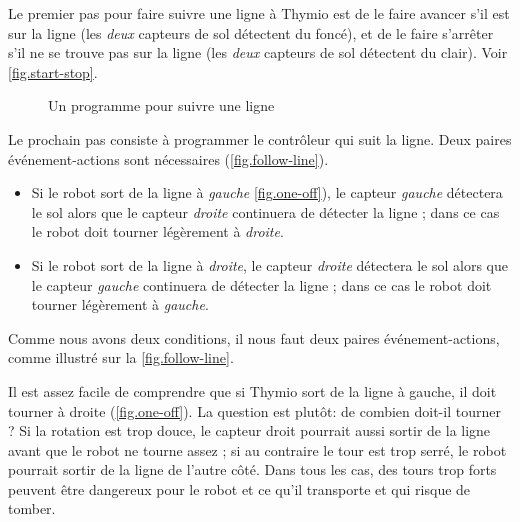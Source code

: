 Le premier pas pour faire suivre une ligne à Thymio est de le faire avancer s'il est sur la ligne (les \emph{deux} capteurs de sol détectent du foncé), et de le faire s'arrêter s'il ne se trouve pas sur la ligne (les \emph{deux} capteurs de sol détectent du clair).
Voir \cref{fig.start-stop}.

\begin{figure}
	\hfill
	\caption{Un programme pour suivre une ligne}
        \label{fig.follow-line-all}
\end{figure}



Le prochain pas consiste à programmer le contrôleur qui suit la ligne.
Deux paires événement-actions sont nécessaires (\cref{fig.follow-line}).

\begin{itemize}
    \item Si le robot sort de la ligne à \emph{gauche}
    \cref{fig.one-off}), le capteur \emph{gauche}
    détectera le sol alors que le capteur \emph{droite}
    continuera de détecter la ligne ;
    dans ce cas le robot doit tourner légèrement à
    \emph{droite}.

    \item Si le robot sort de la ligne à \emph{droite},
    le capteur \emph{droite} détectera le sol
    alors que le capteur \emph{gauche} continuera
    de détecter la ligne ; dans ce cas le robot
    doit tourner légèrement à \emph{gauche}.
	
\end{itemize}

Comme nous avons deux conditions, il nous faut deux paires événement-actions, comme illustré sur la \cref{fig.follow-line}.


Il est assez facile de comprendre que
si Thymio sort de la ligne à gauche,
il doit tourner à droite (\cref{fig.one-off}).
La question est plutôt: de combien doit-il tourner ?
Si la rotation est trop douce, le capteur droit pourrait aussi sortir de la ligne avant que le robot ne tourne assez ;
si au contraire le tour est trop serré, le robot pourrait sortir de la ligne de l'autre côté.
Dans tous les cas, des tours trop forts peuvent être dangereux pour le robot et ce qu'il transporte et qui risque de tomber.

